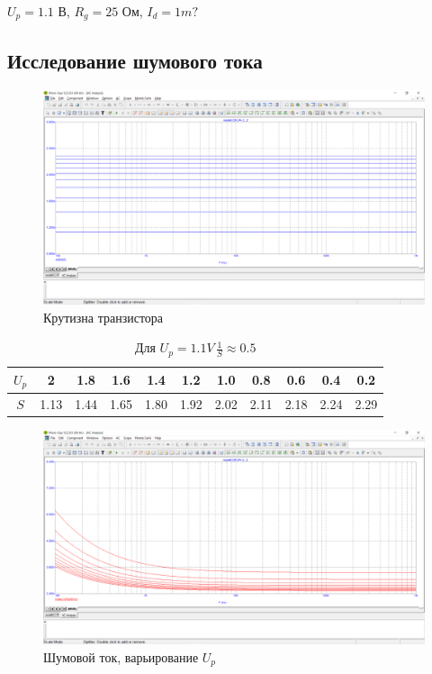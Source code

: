 \documentclass[a4paper, 12pt]{article}%
\begin{document}
$U_p = 1.1$ В, $R_g = 25$ Ом, $I_d = 1m?$
\FloatBarrier
\subsection{Исследование шумового тока}
\FloatBarrier
\begin{figure}[h!]
    \centering
    \includegraphics[scale = 0.4 \textwidth]{images/mod6_1_1.png}
    \caption{Крутизна транзистора}
    \label{fig:m611}
\end{figure}

\begin{table}[h!]
    \centering
    \begin{tabular}{|c|c|c|c|c|c|c|c|c|c|c|}
        $U_p$ & 2 & 1.8 & 1.6 & 1.4 & 1.2 & 1.0 & 0.8 & 0.6 & 0.4 & 0.2\\ \hline
        $S$ & 1.13 & 1.44 & 1.65 & 1.80 & 1.92 & 2.02 & 2.11 & 2.18 & 2.24 & 2.29 \\ \hline
    \end{tabular}
    \caption{Для $U_p = 1.1 V \, \frac{1}{S} \approx 0.5$}
    \label{tab:my_label}
\end{table}

\begin{figure}[h!]
    \centering
    \includegraphics[scale = 0.4 \textwidth]{images/mod6_1_2.png}
    \caption{Шумовой ток, варьирование $U_p$}
    \label{fig:m612}
\end{figure}
\end{document}
